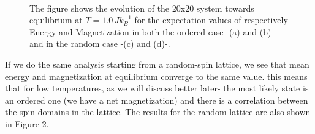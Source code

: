\documentclass[%
 reprint,
 amsmath,amssymb,
 aps,
]{revtex4-1}
\theoremstyle{plain}
\theoremstyle{definition}
\theoremstyle{plain}
\begin{document}
\begin{figure}[ht]
	\centering
	\label{20T1}
	\\
	\caption{The figure shows the evolution of the 20x20 system towards equilibrium at $T=1.0\,Jk_B^{-1}$ for the expectation values of respectively Energy and Magnetization in both the ordered case -(a) and (b)- and in the random case -(c) and (d)-.}
\end{figure} 

If we do the same analysis starting from a random-spin lattice, we see that mean energy and magnetization at equilibrium converge to the same value. this means that for low temperatures, as we will discuss better later- the most likely state is an ordered one (we have a net magnetization) and there is a correlation between the spin domains in the lattice. The results for the random lattice are also shown in Figure 2.
\end{document}
